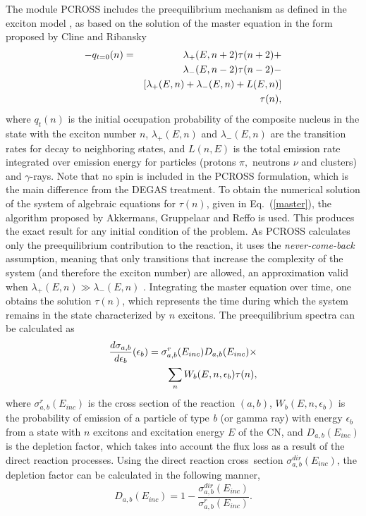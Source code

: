 The module PCROSS includes the preequilibrium mechanism as defined in the
exciton model \cite{Griffin:66}, as based on the solution of the
master equation \cite{Cline:71} in the form proposed by Cline \cite{Cline:72}
and Ribansky \cite{Ribansky:73}
\begin{eqnarray}
-q_{t=0}(n) &=& \lambda _{+}(E,n+2)\tau (n+2)+  \notag \\
&&\lambda _{-}(E,n-2)\tau (n-2)-  \notag \\
&&\left[ \lambda _{+}(E,n)+\lambda _{-}(E,n)+L(E,n)\right]  \notag \\
&&\tau (n),  \label{master}
\end{eqnarray}%
where $q_{t}(n)$ is the initial occupation probability of the composite
nucleus in the state with the exciton number $n$, $\lambda _{+}(E,n)$ and $%
\lambda _{-}(E,n)$ are the transition rates for decay to neighboring states,
and $L(n,E)$ is the total emission rate integrated over emission energy for
particles (protons $\pi ,$ neutrons $\nu $ and clusters) and $\gamma $-rays.
Note that no spin is included in the PCROSS formulation, which is the main
difference from the DEGAS treatment. To obtain the numerical solution of the
system of algebraic equations for $\tau (n)$, given in
Eq.~(\ref{master}), the algorithm proposed by Akkermans, Gruppelaar and Reffo
\cite{Akkermans:80} is used. This produces the exact result for any initial
condition of the problem. As PCROSS calculates only the preequilibrium
contribution to the reaction, it uses the \textit{never-come-back}
assumption, meaning that  only transitions that increase the
complexity of the system (and therefore the exciton number)
are allowed, an approximation valid
when $\lambda _{+}(E,n)\gg \lambda _{-}(E,n)$ .
Integrating the master equation over time, one
obtains the solution $\tau (n)$, which represents the time during which the
system remains in the state characterized by $n$ excitons. The
preequilibrium spectra can be calculated as
\begin{eqnarray}
\frac{d\sigma _{a,b}}{d\epsilon _{b}}(\epsilon _{b})=\sigma
_{a,b}^{r}(E_{inc})D_{a,b}(E_{inc})\times  \notag \\
\sum_{n}W_{b}(E,n,\epsilon _{b})\tau (n),
\end{eqnarray}
where $\sigma _{a,b}^{r}(E_{inc})$ is the cross section of the reaction
$(a,b)$, $W_{b}(E,n,\epsilon _{b})$ is the probability of emission of a
particle of type \textit{b} (or gamma ray) with energy $\epsilon _{b}$ from
a state with $n$ excitons and excitation energy $E$ of the CN, and $%
D_{a,b}(E_{inc})$ is the depletion factor, which takes into account the flux
loss as a result of the direct reaction processes. Using the direct reaction
cross\bigskip\ section $\sigma _{a,b}^{dir}(E_{inc})$, the
depletion factor can be calculated in the following manner,
\begin{equation}
D_{a,b}(E_{inc})=1-\frac{\sigma _{a,b}^{dir}(E_{inc})}{\sigma
_{a,b}^{r}(E_{inc})}.
\end{equation}

